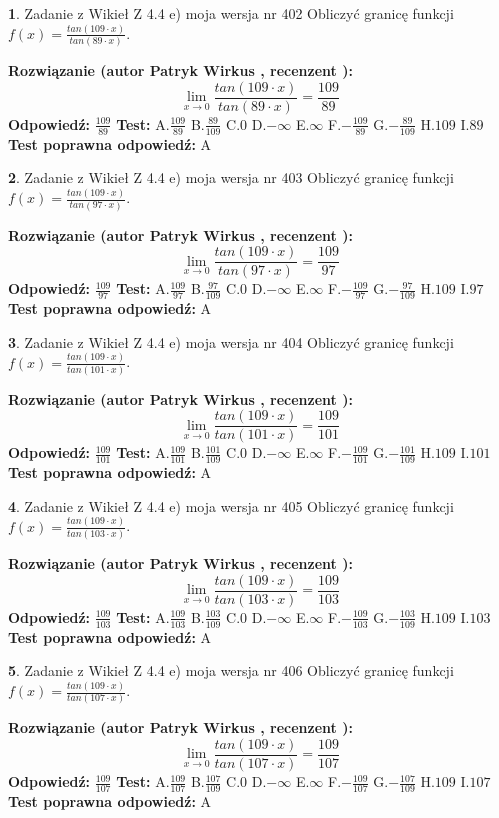\documentclass[12pt, a4paper]{article}
\theoremstyle{definition} %
\newtheorem{zad}{}
\newcommand{\zadStart}[1]{\begin{zad}#1\newline}
\newcommand{\zadStop}{\end{zad}}
\newcommand{\rozwStart}[2]{\noindent \textbf{Rozwiązanie (autor #1 , recenzent #2): }\newline}
\newcommand{\rozwStop}{\newline}
\newcommand{\odpStart}{\noindent \textbf{Odpowiedź:}\newline}
\newcommand{\odpStop}{\newline}
\newcommand{\testStart}{\noindent \textbf{Test:}\newline}
\newcommand{\testStop}{\newline}
\newcommand{\kluczStart}{\noindent \textbf{Test poprawna odpowiedź:}\newline}
\newcommand{\kluczStop}{\newline}
\begin{document}
\zadStart{Zadanie z Wikieł Z 4.4 e) moja wersja nr 402}
Obliczyć granicę funkcji $f(x)=\frac{tan(109\cdot x)}{tan(89\cdot x)}$.
\zadStop
\rozwStart{Patryk Wirkus}{}
$$\lim\limits_{x\to 0}\frac{tan(109\cdot x)}{tan(89\cdot x)}=
\frac{109}{89}$$
\rozwStop
\odpStart
$\frac{109}{89}$
\odpStop
\testStart
A.$\frac{109}{89}$
B.$\frac{89}{109}$
C.$0$
D.$-\infty$
E.$\infty$
F.$-\frac{109}{89}$
G.$-\frac{89}{109}$
H.$109$
I.$89$
\testStop
\kluczStart
A
\kluczStop



\zadStart{Zadanie z Wikieł Z 4.4 e) moja wersja nr 403}
Obliczyć granicę funkcji $f(x)=\frac{tan(109\cdot x)}{tan(97\cdot x)}$.
\zadStop
\rozwStart{Patryk Wirkus}{}
$$\lim\limits_{x\to 0}\frac{tan(109\cdot x)}{tan(97\cdot x)}=
\frac{109}{97}$$
\rozwStop
\odpStart
$\frac{109}{97}$
\odpStop
\testStart
A.$\frac{109}{97}$
B.$\frac{97}{109}$
C.$0$
D.$-\infty$
E.$\infty$
F.$-\frac{109}{97}$
G.$-\frac{97}{109}$
H.$109$
I.$97$
\testStop
\kluczStart
A
\kluczStop



\zadStart{Zadanie z Wikieł Z 4.4 e) moja wersja nr 404}
Obliczyć granicę funkcji $f(x)=\frac{tan(109\cdot x)}{tan(101\cdot x)}$.
\zadStop
\rozwStart{Patryk Wirkus}{}
$$\lim\limits_{x\to 0}\frac{tan(109\cdot x)}{tan(101\cdot x)}=
\frac{109}{101}$$
\rozwStop
\odpStart
$\frac{109}{101}$
\odpStop
\testStart
A.$\frac{109}{101}$
B.$\frac{101}{109}$
C.$0$
D.$-\infty$
E.$\infty$
F.$-\frac{109}{101}$
G.$-\frac{101}{109}$
H.$109$
I.$101$
\testStop
\kluczStart
A
\kluczStop



\zadStart{Zadanie z Wikieł Z 4.4 e) moja wersja nr 405}
Obliczyć granicę funkcji $f(x)=\frac{tan(109\cdot x)}{tan(103\cdot x)}$.
\zadStop
\rozwStart{Patryk Wirkus}{}
$$\lim\limits_{x\to 0}\frac{tan(109\cdot x)}{tan(103\cdot x)}=
\frac{109}{103}$$
\rozwStop
\odpStart
$\frac{109}{103}$
\odpStop
\testStart
A.$\frac{109}{103}$
B.$\frac{103}{109}$
C.$0$
D.$-\infty$
E.$\infty$
F.$-\frac{109}{103}$
G.$-\frac{103}{109}$
H.$109$
I.$103$
\testStop
\kluczStart
A
\kluczStop



\zadStart{Zadanie z Wikieł Z 4.4 e) moja wersja nr 406}
Obliczyć granicę funkcji $f(x)=\frac{tan(109\cdot x)}{tan(107\cdot x)}$.
\zadStop
\rozwStart{Patryk Wirkus}{}
$$\lim\limits_{x\to 0}\frac{tan(109\cdot x)}{tan(107\cdot x)}=
\frac{109}{107}$$
\rozwStop
\odpStart
$\frac{109}{107}$
\odpStop
\testStart
A.$\frac{109}{107}$
B.$\frac{107}{109}$
C.$0$
D.$-\infty$
E.$\infty$
F.$-\frac{109}{107}$
G.$-\frac{107}{109}$
H.$109$
I.$107$
\testStop
\kluczStart
A
\kluczStop
\end{document}
